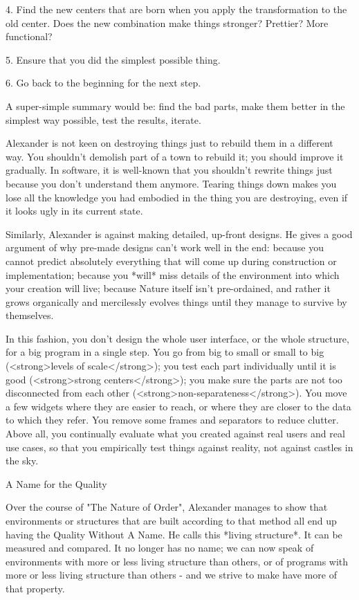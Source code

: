 4. Find the new centers that are born when you apply the transformation to the old center.  Does the new combination make things stronger?  Prettier?  More functional?

5. Ensure that you did the simplest possible thing.

6. Go back to the beginning for the next step.

A super-simple summary would be:  find the bad parts, make them better in the simplest way possible, test the results, iterate.

Alexander is not keen on destroying things just to rebuild them in a different way.  You shouldn't demolish part of a town to rebuild it; you should improve it gradually.  In software, it is well-known that you shouldn't rewrite things just because you don't understand them anymore.  Tearing things down makes you lose all the knowledge you had embodied in the thing you are destroying, even if it looks ugly in its current state.

Similarly, Alexander is against making detailed, up-front designs.  He gives a good argument of why pre-made designs can't work well in the end:  because you cannot predict absolutely everything that will come up during construction or implementation; because you *will* miss details of the environment into which your creation will live; because Nature itself isn't pre-ordained, and rather it grows organically and mercilessly evolves things until they manage to survive by themselves.

In this fashion, you don't design the whole user interface, or the whole structure, for a big program in a single step.  You go from big to small or small to big (<strong>levels of scale</strong>); you test each part individually until it is good (<strong>strong centers</strong>); you make sure the parts are not too disconnected from each other (<strong>non-separateness</strong>).  You move a few widgets where they are easier to reach, or where they are closer to the data to which they refer.  You remove some frames and separators to reduce clutter.  Above all, you continually evaluate what you created against real users and real use cases, so that you empirically test things against reality, not against castles in the sky.

A Name for the Quality

Over the course of "The Nature of Order", Alexander manages to show that environments or structures that are built according to that method all end up having the Quality Without A Name.  He calls this *living structure*.  It can be measured and compared.  It no longer has no name; we can now speak of environments with more or less living structure than others, or of programs with more or less living structure than others - and we strive to make have more of that property.

